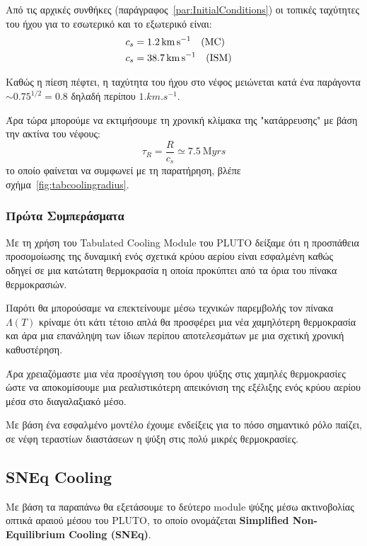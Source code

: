 	
	Από τις αρχικές συνθήκες (παράγραφος~\ref{par:InitialConditions}) οι τοπικές ταχύτητες του ήχου για το εσωτερικό και το εξωτερικό είναι:
	\begin{align}
	c_s &=\SI{1.2}{km.s^{-1}} \qq{(MC)} \\
	c_s &=\SI{38.7}{km.s^{-1}} \qq{(ISM)}
	\end{align}
	
	Καθώς η πίεση πέφτει, η ταχύτητα του ήχου στο νέφος μειώνεται κατά ένα παράγοντα $\sim 0.75^{1/2}=0.8$ δηλαδή περίπου $1\si{.km.s^{-1}}$.
	
%	
	Άρα τώρα μπορούμε να εκτιμήσουμε τη χρονική κλίμακα της "κατάρρευσης" με βάση την ακτίνα του νέφους:
	\begin{equation}
	\tau_R=\frac{R}{c_s} \simeq \SI{7.5}{\mega yrs}
	\end{equation}
	το οποίο φαίνεται να συμφωνεί με τη παρατήρηση, βλέπε σχήμα~\ref{fig:tabcoolingradius}.
	
	\subsubsection{Πρώτα Συμπεράσματα}
	Με τη χρήση του Tabulated Cooling Module του PLUTO δείξαμε ότι η προσπάθεια προσομοίωσης της δυναμική ενός σχετικά κρύου αερίου είναι εσφαλμένη καθώς οδηγεί σε μια κατώτατη θερμοκρασία η οποία προκύπτει από τα όρια του πίνακα θερμοκρασιών.
	
	Παρότι θα μπορούσαμε να επεκτείνουμε μέσω τεχνικών παρεμβολής τον πίνακα  $\Lambda (T)$ κρίναμε ότι κάτι τέτοιο απλά θα προσφέρει μια νέα χαμηλότερη θερμοκρασία και άρα μια επανάληψη των ίδιων περίπου αποτελεσμάτων με μια σχετική χρονική καθυστέρηση. 
	
	Άρα χρειαζόμαστε μια νέα προσέγγιση του όρου ψύξης στις χαμηλές θερμοκρασίες ώστε να αποκομίσουμε μια ρεαλιστικότερη απεικόνιση της εξέλιξης ενός κρύου αερίου μέσα στο διαγαλαξιακό μέσο.  
	
	Με βάση ένα εσφαλμένο μοντέλο έχουμε ενδείξεις για το πόσο σημαντικό ρόλο παίζει, σε νέφη τεραστίων διαστάσεων η ψύξη στις πολύ μικρές θερμοκρασίες. 
	
	\subsection{SNEq Cooling}
	Με βάση τα παραπάνω θα εξετάσουμε το δεύτερο module ψύξης μέσω ακτινοβολίας οπτικά αραιού μέσου του PLUTO, το οποίο ονομάζεται \textbf{Simplified Non-Equilibrium Cooling (SNEq)}. 
	
